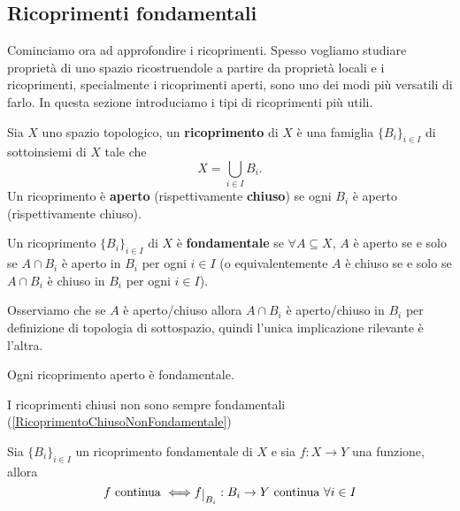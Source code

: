 \begin{multicols*}{2}
\section{Ricoprimenti fondamentali}
Cominciamo ora ad approfondire i ricoprimenti. Spesso vogliamo studiare proprietà di uno spazio ricostruendole a partire da proprietà locali e i ricoprimenti, specialmente i ricoprimenti aperti, sono uno dei modi più versatili di farlo. In questa sezione introduciamo i tipi di ricoprimenti più utili.
\begin{definition}[Ricoprimento]
Sia $X$ uno spazio topologico, un \textbf{ricoprimento} di $X$ è una famiglia $\{B_i\}_{i\in I}$ di sottoinsiemi di $X$ tale che \[X=\bigcup_{i\in I}B_i.\]
Un ricoprimento è \textbf{aperto} (rispettivamente \textbf{chiuso}) se ogni $B_i$ è aperto (rispettivamente chiuso).
\end{definition}
\begin{definition}
Un ricoprimento $\{B_i\}_{i\in I}$ di $X$ è \textbf{fondamentale} se $\forall A\subseteq X$, $A$ è aperto se e solo se $A\cap B_i$ è aperto in $B_i$ per ogni $i\in I$ (o equivalentemente $A$ è chiuso se e solo se $A\cap B_i$ è chiuso in $B_i$ per ogni $i\in I$).
\end{definition}
\begin{remark}
Osserviamo che se $A$ è aperto/chiuso allora $A\cap B_i$ è aperto/chiuso in $B_i$ per definizione di topologia di sottospazio, quindi l'unica implicazione rilevante è l'altra.
\end{remark}

\begin{theorem}\label{RicoprimentiApertiSonoFondamentali}
Ogni ricoprimento aperto è fondamentale.
\end{theorem}

\begin{remark}
I ricoprimenti chiusi non sono sempre fondamentali (\ref{RicoprimentoChiusoNonFondamentale})
\end{remark}

\begin{theorem}\label{IncollamentoDelleFunzioniRicoprimentoFondamentale}
Sia $\{B_i\}_{i\in I}$ un ricoprimento fondamentale di $X$ e sia $f:X\to Y$ una funzione, allora
\[f\text{ continua }\coimplies f\res {B_i}:B_i\to Y \text{ continua }\forall i\in I\]
\end{theorem}


\end{multicols*}
